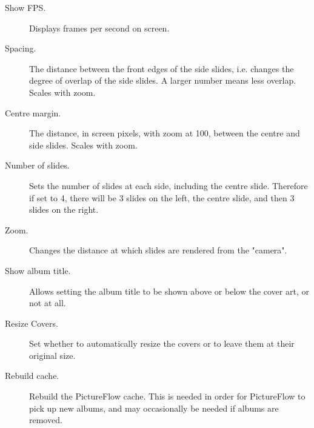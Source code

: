 \begin{description}
  \item[Show FPS.] Displays frames per second on screen.
  \item[Spacing.] The distance between the front edges of the side slides, i.e. changes
  the degree of overlap of the side slides. A larger number means less overlap. Scales with zoom.
  \item[Centre margin.] The distance, in screen pixels, with zoom at 100, between
  the centre and side slides. Scales with zoom.
  \item[Number of slides.] Sets the number of slides at each side, including the
  centre slide. Therefore if set to 4, there will be 3 slides on the left,
  the centre slide, and then 3 slides on the right.
  \item[Zoom.] Changes the distance at which slides are rendered from the "camera".
  \item[Show album title.] Allows setting the album title to be shown above or
  below the cover art, or not at all.
  \item[Resize Covers.] Set whether to automatically resize the covers or to leave
  them at their original size.
  \item[Rebuild cache.] Rebuild the PictureFlow cache. This is needed in order
  for PictureFlow to pick up new albums, and may occasionally be needed if albums
  are removed.
\end{description}
